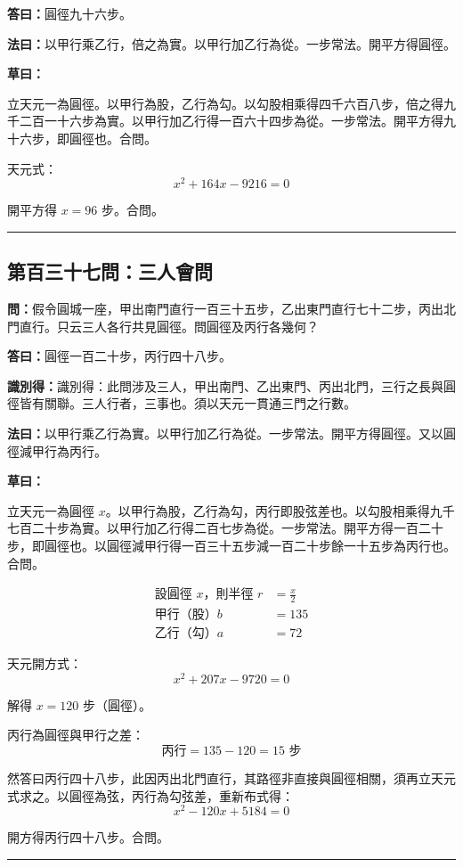 \documentclass[11pt,a4paper]{article}
\newcommand{\longline}{\noindent\rule{\textwidth}{0.4pt}}
\newcommand{\wen}[1]{\par\noindent\textbf{\textcolor{probcolor}{問：}}{#1}\par}
\newcommand{\da}[1]{\par\noindent\textbf{\textcolor{anscolor}{答曰：}}{#1}\par}
\newcommand{\fayue}[1]{\par\noindent\textbf{\textcolor{methodcolor}{法曰：}}{#1}\par}
\newcommand{\caoyue}[1]{\par\noindent\textbf{草曰：}{#1}\par}
\newcommand{\zhi}[1]{\par\noindent\textbf{識別得：}{#1}\par}
\begin{document}
\da{圓徑九十六步。}

\fayue{以甲行乘乙行，倍之為實。以甲行加乙行為從。一步常法。開平方得圓徑。}

\caoyue{
立天元一為圓徑。以甲行為股，乙行為勾。以勾股相乘得四千六百八步，倍之得九千二百一十六步為實。以甲行加乙行得一百六十四步為從。一步常法。開平方得九十六步，即圓徑也。合問。

天元式：
$$x^2 + 164x - 9216 = 0$$

開平方得 $x = 96$ 步。合問。
}

\vspace{0.5cm}
\longline

\subsection*{第百三十七問：三人會問}
\wen{假令圓城一座，甲出南門直行一百三十五步，乙出東門直行七十二步，丙出北門直行。只云三人各行共見圓徑。問圓徑及丙行各幾何？}

\da{圓徑一百二十步，丙行四十八步。}

\zhi{識別得：此問涉及三人，甲出南門、乙出東門、丙出北門，三行之長與圓徑皆有關聯。三人行者，三事也。須以天元一貫通三門之行數。}

\fayue{以甲行乘乙行為實。以甲行加乙行為從。一步常法。開平方得圓徑。又以圓徑減甲行為丙行。}

\caoyue{
立天元一為圓徑 $x$。以甲行為股，乙行為勾，丙行即股弦差也。以勾股相乘得九千七百二十步為實。以甲行加乙行得二百七步為從。一步常法。開平方得一百二十步，即圓徑也。以圓徑減甲行得一百三十五步減一百二十步餘一十五步為丙行也。合問。

\begin{align*}
\text{設圓徑 } x \text{，則半徑 } r &= \frac{x}{2} \\
\text{甲行（股）} b &= 135 \\
\text{乙行（勾）} a &= 72
\end{align*}

天元開方式：
$$x^2 + 207x - 9720 = 0$$

解得 $x = 120$ 步（圓徑）。

丙行為圓徑與甲行之差：
$$\text{丙行} = 135 - 120 = 15 \text{ 步}$$

然答曰丙行四十八步，此因丙出北門直行，其路徑非直接與圓徑相關，須再立天元式求之。以圓徑為弦，丙行為勾弦差，重新布式得：
$$x^2 - 120x + 5184 = 0$$

開方得丙行四十八步。合問。
}

\vspace{0.5cm}
\longline
\end{document}
